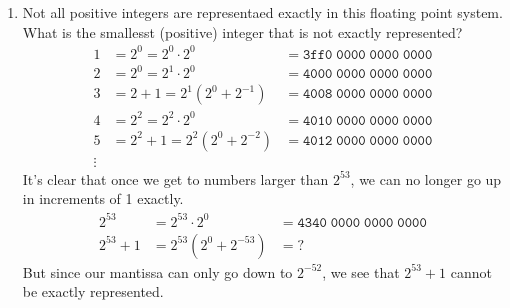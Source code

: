 \documentclass[11pt]{article}
\begin{document}
\begin{enumerate}
\begin{enumerate}
		      \item Not all positive integers are representaed exactly in this floating point system.  What is the smallesst (positive) integer that is not exactly represented?
		            \begin{align*}
			            1 & = 2^0 = 2^0 \cdot 2^0           & = \mathtt{3ff0\;0000\;0000\;0000} \\
			            2 & = 2^0 = 2^1 \cdot 2^0           & = \mathtt{4000\;0000\;0000\;0000} \\
			            3 & = 2 + 1 = 2^1 (2^0 + 2^{-1})    & = \mathtt{4008\;0000\;0000\;0000} \\
			            4 & = 2^2 = 2^2 \cdot 2^0           & = \mathtt{4010\;0000\;0000\;0000} \\
			            5 & = 2^2 + 1 =  2^2 (2^0 + 2^{-2}) & = \mathtt{4012\;0000\;0000\;0000} \\
			            \vdots
		            \end{align*}
		            It's clear that once we get to numbers larger than \(2^{53}\), we can no longer go up in increments of 1 exactly.
		            \begin{align*}
			            2^{53}   & = 2^{53} \cdot 2^0       & = \mathtt{4340\;0000\;0000\;0000} \\
			            2^{53}+1 & = 2^{53} (2^0 + 2^{-53}) & = \mathtt{?}
		            \end{align*}
		            But since our mantissa can only go down to \(2^{-52}\), we see that \(2^{53}+1\) cannot be exactly represented.
	      \end{enumerate}


\end{enumerate}
\end{document}
